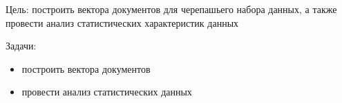 

Цель: построить вектора документов для черепашьего набора данных, а также провести анализ статистических характеристик данных

Задачи:
\begin{itemize}
    \item построить вектора документов
    \item провести анализ статистических данных
\end{itemize}

\clearpage
